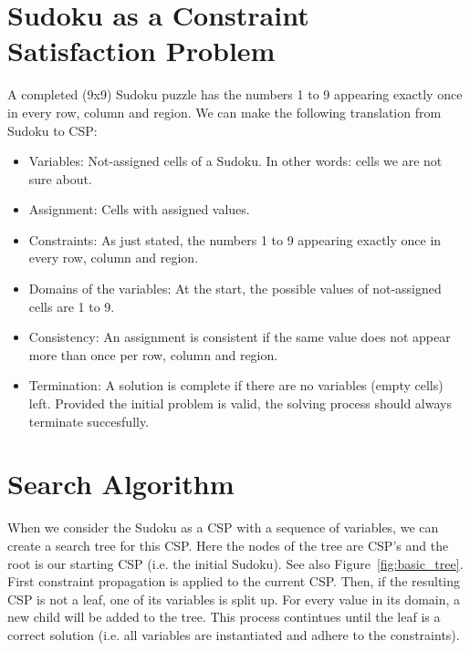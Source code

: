 \documentclass[11pt]{article} %
\begin{document}
\section{Sudoku as a Constraint Satisfaction Problem}
\label{sec:sudokuCSP}

A completed (9x9) Sudoku puzzle has the numbers 1 to 9 appearing exactly once in every row, column and region. We can make the following translation from Sudoku to CSP:
\begin{itemize}
\item Variables: Not-assigned cells of a Sudoku. In other words: cells we are not sure about.
\item Assignment: Cells with assigned values.
\item Constraints: As just stated,  the numbers 1 to 9 appearing exactly once in every row, column and region.
\item Domains of the variables: At the start, the possible values of not-assigned cells are 1 to 9.
\item Consistency: An assignment is consistent if the same value does not appear more than once per row, column and region.
\item Termination: A solution is complete if there are no variables (empty cells) left. Provided the initial problem is valid, the solving process should always terminate succesfully.
\end{itemize}

\section{Search Algorithm}
\label{sec:search}

When we consider the Sudoku as a CSP with a sequence of variables, we can create a search tree for this CSP. Here the nodes of the tree are CSP's and the root is our starting CSP (i.e. the initial Sudoku). See also Figure~\ref{fig:basic_tree}. First constraint propagation is applied to the current CSP. Then, if the resulting CSP is not a leaf, one of its variables is split up. For every value in its domain, a new child will be added to the tree. This process contintues until the leaf is a correct solution (i.e. all variables are instantiated and adhere to the constraints).
\end{document}
